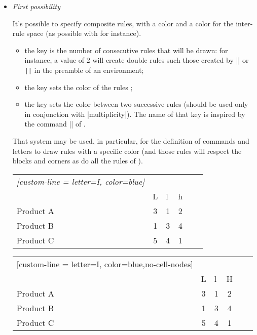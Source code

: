 \documentclass[dvipsnames]{article}%
\begin{document}
\begin{itemize}
\item \emph{First possibility}\par\nobreak

It's possible to specify composite rules, with a color and a color for the
inter-rule space (as possible with  for instance).

\begin{itemize}
\item the key  is the number of consecutive rules that
will be drawn: for instance, a value of $2$ will create double rules such those
created by |\hline\hline| or \verb+||+ in the preamble of an environment;

\item the key  sets the color of the rules ;

\item the key  sets the color between two successive rules
(should be used only in conjonction with |multiplicity|). The name of that key
is inspired by the command |\doublerulesepcolor| of .
\end{itemize}

\medskip
That system may be used, in particular, for the definition of commands and
letters to draw rules with a specific color (and those rules will respect the
blocks and corners as do all the rules of ). 

\medskip
\begin{Code}
\begin{NiceTabular}{lcIcIc}\emph{[custom-line = {letter=I, color=blue}]}
\hline
          &  \\
          & L & l & h \\
\hline
Product A & 3 & 1 & 2 \\
Product B & 1 & 3 & 4 \\
Product C & 5 & 4 & 1 \\
\hline
\end{NiceTabular}
\end{Code}


\begin{center}
\begin{NiceTabular}{lcIcIc}[custom-line = {letter=I, color=blue},no-cell-nodes]
\hline
          &  \\
          & L & l & H \\
\hline
Product A & 3 & 1 & 2 \\
Product B & 1 & 3 & 4 \\
Product C & 5 & 4 & 1 \\
\hline
\end{NiceTabular}
\end{center}



\end{itemize}
\end{document}
